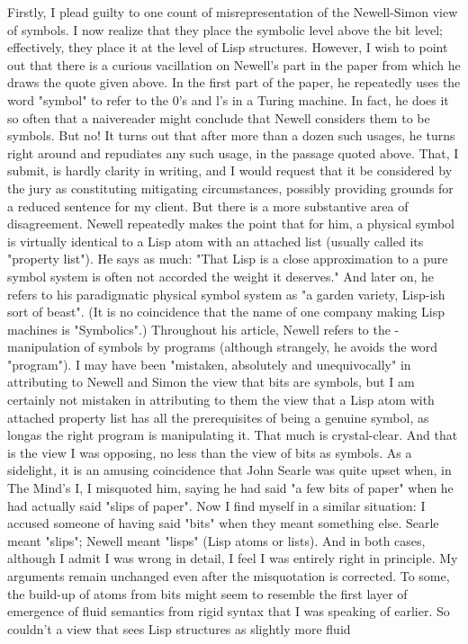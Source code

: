          Firstly, I plead guilty to one count of misrepresentation of the Newell-Simon
view of symbols. I now realize that they place the symbolic level above the bit level;
effectively, they place it at the level of Lisp structures. However, I wish to point out
that there is a curious vacillation on Newell's part in the paper from which he draws
the quote given above. In the first part of the paper, he repeatedly uses the word
"symbol" to refer to the 0's and l's in a Turing machine. In fact, he does it so often that
a naivereader might conclude that Newell considers them to be symbols. But no! It
turns out that after more than a dozen such usages, he turns right around and
repudiates any such usage, in the passage quoted above. That, I submit, is hardly
clarity in writing, and I would request that it be considered by the jury as constituting
mitigating circumstances, possibly providing grounds for a reduced sentence for my
client.
         But there is a more substantive area of disagreement. Newell repeatedly makes
the point that for him, a physical symbol is virtually identical to a Lisp atom with an
attached list (usually called its "property list"). He says as much: "That Lisp is a close
approximation to a pure symbol system is often not accorded the weight it deserves."
And later on, he refers to his paradigmatic physical symbol system as "a garden
variety, Lisp-ish sort of beast". (It is no coincidence that the name of one company
making Lisp machines is "Symbolics".) Throughout his article, Newell refers to the -
manipulation of symbols by programs (although strangely, he avoids the word
"program"). I may have been "mistaken, absolutely and unequivocally" in attributing
to Newell and Simon the view that bits are symbols, but I am certainly not mistaken
in attributing to them the view that a Lisp atom with attached property list has all the
prerequisites of being a genuine symbol, as longas the right program is manipulating
it. That much is crystal-clear. And that is the view I was opposing, no less than the
view of bits as symbols.
         As a sidelight, it is an amusing coincidence that John Searle was quite upset
when, in The Mind's I, I misquoted him, saying he had said "a few bits of paper"
when he had actually said "slips of paper". Now I find myself in a similar situation: I
accused someone of having said "bits" when they meant something else. Searle meant
"slips"; Newell meant "lisps" (Lisp atoms or lists). And in both cases, although I
admit I was wrong in detail, I feel I was entirely right in principle. My arguments
remain unchanged even after the misquotation is corrected.
         To some, the build-up of atoms from bits might seem to resemble the first
layer of emergence of fluid semantics from rigid syntax that I was speaking of earlier.
So couldn't a view that sees Lisp structures as slightly more fluid




